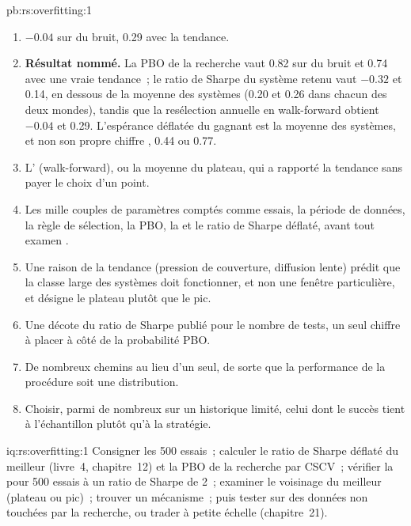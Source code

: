 \begin{solution}{pb:rs:overfitting:1}
\begin{enumerate}
retire les jours juste après l'ensemble de test, dont les variables explicatives portent encore son information.
\item $-0.04$ sur du bruit, 0.29 avec la tendance.
\item \textbf{Résultat nommé.} La PBO de la recherche vaut 0.82 sur du bruit et 0.74 avec une vraie tendance~; le ratio de Sharpe  du système retenu vaut $-0.32$ et 0.14, en dessous
de la moyenne des systèmes (0.20 et 0.26 dans chacun des deux mondes), tandis que la resélection annuelle en walk-forward obtient $-0.04$ et 0.29. L'espérance déflatée du gagnant est la
moyenne des systèmes, et non son propre chiffre , 0.44 ou 0.77.
\item L' (walk-forward), ou la moyenne du plateau, qui a rapporté la tendance sans payer le choix d'un point.
\item Les mille couples de paramètres comptés comme essais, la période de données, la règle de sélection, la PBO, la  et le ratio de Sharpe déflaté, avant tout
examen .
\item Une raison de la tendance (pression de couverture, diffusion lente) prédit que la classe large des systèmes doit fonctionner, et non une fenêtre particulière, et désigne le
plateau plutôt que le pic.
\item Une décote du ratio de Sharpe publié pour le nombre de tests, un seul chiffre à placer à côté de la probabilité PBO.
\item De nombreux chemins  au lieu d'un seul, de sorte que la performance de la procédure soit une distribution.
\item Choisir, parmi de nombreux  sur un historique limité, celui dont le succès tient à l'échantillon plutôt qu'à la stratégie.
\end{enumerate}
\end{solution}

\begin{solution}{iq:rs:overfitting:1}
Consigner les 500 essais~; calculer le ratio de Sharpe déflaté du meilleur (livre~4, chapitre~12) et la PBO de la recherche par CSCV~; vérifier la  pour
500 essais à un ratio de Sharpe de 2~; examiner le voisinage du meilleur (plateau ou pic)~; trouver un mécanisme~; puis tester sur des données non touchées par la recherche, ou trader
à petite échelle (chapitre~21).
\end{solution}

